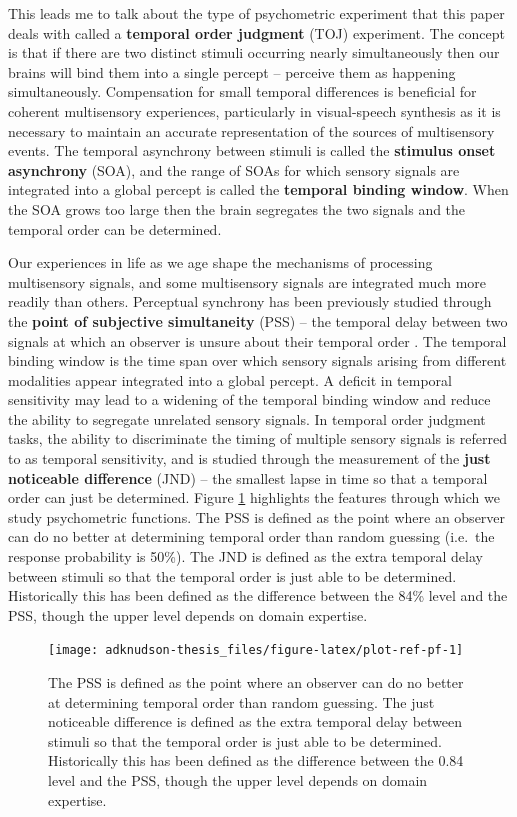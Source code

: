 \documentclass[11pt, oneside]{book}
\begin{document}
This leads me to talk about the type of psychometric experiment that this paper deals with called a \textbf{temporal order judgment} (TOJ) experiment. The concept is that if there are two distinct stimuli occurring nearly simultaneously then our brains will bind them into a single percept -- perceive them as happening simultaneously. Compensation for small temporal differences is beneficial for coherent multisensory experiences, particularly in visual-speech synthesis as it is necessary to maintain an accurate representation of the sources of multisensory events. The temporal asynchrony between stimuli is called the \textbf{stimulus onset asynchrony} (SOA), and the range of SOAs for which sensory signals are integrated into a global percept is called the \textbf{temporal binding window}. When the SOA grows too large then the brain segregates the two signals and the temporal order can be determined.

Our experiences in life as we age shape the mechanisms of processing multisensory signals, and some multisensory signals are integrated much more readily than others. Perceptual synchrony has been previously studied through the \textbf{point of subjective simultaneity} (PSS) -- the temporal delay between two signals at which an observer is unsure about their temporal order \citep{stone2001now}. The temporal binding window is the time span over which sensory signals arising from different modalities appear integrated into a global percept. A deficit in temporal sensitivity may lead to a widening of the temporal binding window and reduce the ability to segregate unrelated sensory signals. In temporal order judgment tasks, the ability to discriminate the timing of multiple sensory signals is referred to as temporal sensitivity, and is studied through the measurement of the \textbf{just noticeable difference} (JND) -- the smallest lapse in time so that a temporal order can just be determined. Figure \ref{fig:plot-ref-pf} highlights the features through which we study psychometric functions. The PSS is defined as the point where an observer can do no better at determining temporal order than random guessing (i.e.~the response probability is 50\%). The JND is defined as the extra temporal delay between stimuli so that the temporal order is just able to be determined. Historically this has been defined as the difference between the 84\% level and the PSS, though the upper level depends on domain expertise.

\begin{figure}

{\centering \texttt{[image: adknudson-thesis\_files/figure-latex/plot-ref-pf-1]} 

}

\caption{The PSS is defined as the point where an observer can do no better at determining temporal order than random guessing. The just noticeable difference is defined as the extra temporal delay between stimuli so that the temporal order is just able to be determined. Historically this has been defined as the difference between the 0.84 level and the PSS, though the upper level depends on domain expertise.}\label{fig:plot-ref-pf}
\end{figure}
\end{document}
